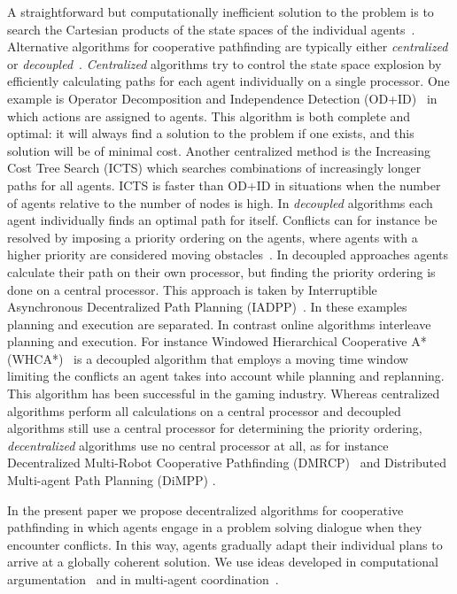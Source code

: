 A straightforward but computationally inefficient solution to the problem is to 
search the Cartesian products of the state spaces of the individual 
agents~\cite{hopcroft1984}. Alternative algorithms for cooperative pathfinding 
are typically either \emph{centralized} or \emph{decoupled}~\cite{latombe1991}.
\emph{Centralized} algorithms try to control the state space explosion by 
efficiently calculating paths for each agent individually on a single 
processor. One example is Operator Decomposition and Independence Detection 
(OD+ID)~\cite{standley2010,standley2011} in which actions are assigned to agents. 
This algorithm is both complete and 
optimal: it will always find a solution to the problem if one exists, and this 
solution will be of minimal cost.
Another centralized method is the Increasing Cost Tree 
Search (ICTS) \cite{sharon2013} which searches combinations of increasingly 
longer paths for all agents. ICTS is faster than OD+ID in situations when the 
number of agents relative to the number of nodes is high.
In \emph{decoupled} algorithms each agent individually finds an optimal path 
for itself. Conflicts can for instance be resolved by imposing a priority 
ordering on the agents, where agents with a higher priority are considered 
moving obstacles~\cite{bennewitz2002}.
In decoupled approaches agents calculate their path on their own processor, but finding the priority ordering is done on a central 
processor. This 
approach is taken by Interruptible Asynchronous Decentralized Path Planning 
(IADPP)~\cite{cap2012}.
In these examples planning and execution are separated. In contrast online algorithms 
interleave planning and execution. For instance Windowed Hierarchical Cooperative A* 
(WHCA*)~\cite{silver2005} is a decoupled algorithm that employs a moving time window limiting the 
conflicts an agent takes into account while planning and replanning. This 
algorithm has been successful in the gaming industry.
Whereas centralized algorithms perform all calculations on a central processor and decoupled algorithms still use a central processor for determining the priority ordering, \emph{decentralized} algorithms use no central processor at all, as for instance Decentralized 
Multi-Robot Cooperative Pathfinding (DMRCP)~\cite{wei2016} and Distributed 
Multi-agent Path Planning (DiMPP) \cite{chouhan2017}.

In the present paper we propose decentralized algorithms for cooperative 
pathfinding in which agents engage in a problem solving dialogue when they 
encounter conflicts. In this way, agents gradually adapt their individual 
plans to arrive at a globally coherent solution. We use ideas developed in 
computational argumentation~\cite{rahwanSimari2009} and in multi-agent 
coordination~\cite[pp.~202--204]{wooldridge2009}.

